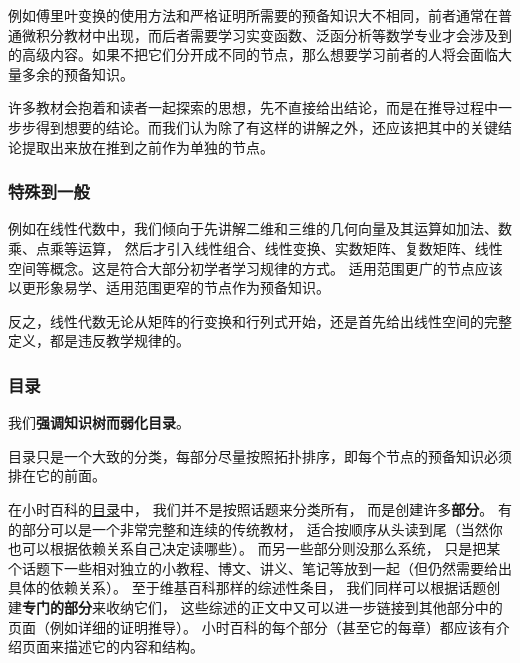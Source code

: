 例如傅里叶变换的使用方法和严格证明所需要的预备知识大不相同，前者通常在普通微积分教材中出现，而后者需要学习实变函数、泛函分析等数学专业才会涉及到的高级内容。如果不把它们分开成不同的节点，那么想要学习前者的人将会面临大量多余的预备知识。

许多教材会抱着和读者一起探索的思想，先不直接给出结论，而是在推导过程中一步步得到想要的结论。而我们认为除了有这样的讲解之外，还应该把其中的关键结论提取出来放在推到之前作为单独的节点。

\subsubsection{特殊到一般}
例如在线性代数中，我们倾向于先讲解二维和三维的几何向量及其运算如加法、数乘、点乘等运算， 然后才引入线性组合、线性变换、实数矩阵、复数矩阵、线性空间等概念。这是符合大部分初学者学习规律的方式。 适用范围更广的节点应该以更形象易学、适用范围更窄的节点作为预备知识。

反之，线性代数无论从矩阵的行变换和行列式开始，还是首先给出线性空间的完整定义，都是违反教学规律的。

\subsubsection{目录}
我们\textbf{强调知识树而弱化目录}。 

目录只是一个大致的分类，每部分尽量按照拓扑排序，即每个节点的预备知识必须排在它的前面。

在小时百科的\href{http://wuli.wiki/online}{目录}中， 我们并不是按照话题来分类所有， 而是创建许多\textbf{部分}。 有的部分可以是一个非常完整和连续的传统教材， 适合按顺序从头读到尾（当然你也可以根据依赖关系自己决定读哪些）。 而另一些部分则没那么系统， 只是把某个话题下一些相对独立的小教程、博文、讲义、笔记等放到一起（但仍然需要给出具体的依赖关系）。 至于维基百科那样的综述性条目， 我们同样可以根据话题创建\textbf{专门的部分}来收纳它们， 这些综述的正文中又可以进一步链接到其他部分中的页面（例如详细的证明推导）。 小时百科的每个部分（甚至它的每章）都应该有介绍页面来描述它的内容和结构。




